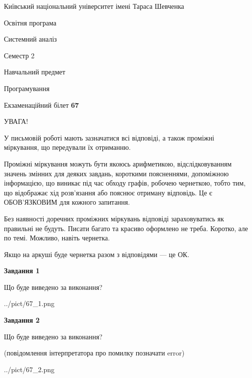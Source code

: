 \documentclass[12pt, ukrainian]{article}
\begin{document}
{{\begin {small}\par
{ \center  Київський національний університет імені Тараса Шевченка \par}
{\parbox {5 cm}{Освітня програма \hfill}{\parbox {7 cm}{Системний аналіз \hfill}}\parbox {6 cm}{\hfill Семестр 2}}\par
{\parbox {5 cm} {Навчальний предмет \hfill}\parbox {7 cm}{Програмування \hfill}\parbox {6cm}{\hfill}\par}\vspace{-7pt} \end{small}}{\center Екзаменаційний білет \No \textbf
{ 67 }\par}}
{
\begin {large}
УВАГА!

У письмовій роботі мають зазначатися всі відповіді, а також проміжні міркування, що передували їх отриманню.

Проміжні міркування можуть бути якоюсь арифметикою, відслідковуванням зна\-чень змінних для деяких завдань,
короткими поясненнями, допоміжною інформацією, що виникає під час обходу графів, робочею чернеткою,
тобто тим, що відображає хід розв’язання або пояснює отриману відповідь.
Це є ОБОВ’ЯЗКОВИМ для кожного запитання.

Без наявності доречних проміжних міркувань відповіді зараховуватись як правиль\-ні не будуть.
Писати багато та красиво оформлено не треба. Коротко, але по темі. Можли\-во, навіть чернетка.

Якщо на аркуші буде чернетка разом з відповідями --- це ОК.

\newpage

{\begin {center}\textbf{Завдання 1}\end {center}}\par
Що буде виведено за виконання?\par
\begin{center}
	{../pict/67_1.png}
\end{center}
\newpage

{\begin {center}\textbf{Завдання 2}\end {center}}\par
Що буде виведено за виконання?\par
 (повідомлення інтерпретатора про помилку позначати error)\par
\begin{center}
	{../pict/67_2.png}
\end{center}
\newpage


\end{large}}
\end{document}
